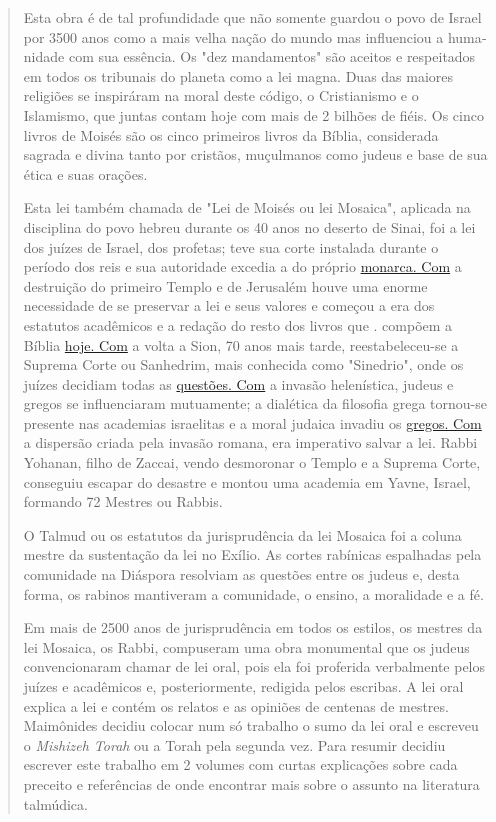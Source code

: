 \begin{quote}
Esta obra é de tal profundidade que não somente guardou o povo de Israel
por 3500 anos como a mais velha nação do mundo mas influenciou a
huma­nidade com sua essência. Os "dez mandamentos" são aceitos e
respeitados em to­dos os tribunais do planeta como a lei magna. Duas das
maiores religiões se inspirá­ram na moral deste código, o Cristianismo e
o Islamismo, que juntas contam hoje com mais de 2 bilhões de fiéis. Os
cinco livros de Moisés são os cinco primeiros livros da Bíblia,
considerada sagrada e divina tanto por cristãos, muçulmanos como judeus
e base de sua ética e suas orações.

Esta lei também chamada de "Lei de Moisés ou lei Mosaica", aplicada na
disciplina do povo hebreu durante os 40 anos no deserto de Sinai, foi a
lei dos juízes de Israel, dos profetas; teve sua corte instalada durante
o período dos reis
e sua autoridade excedia a do próprio
\href{http://monarca.Com}{{monarca. Com}} a destruição do primeiro
Tem­plo e de Jerusalém houve uma enorme necessidade de se preservar a
lei e seus valo­res e começou a era dos estatutos acadêmicos e a redação
do resto dos livros que . compõem a Bíblia \href{http://hoje.Com}{{hoje.
Com}} a volta a Sion, 70 anos mais tarde, reestabeleceu-se a Suprema
Corte ou Sanhedrim, mais conhecida como "Sinedrio", onde os juízes
decidiam todas as \href{http://questões.Com}{{questões. Com}} a invasão
helenística, judeus e gregos se influen­ciaram mutuamente; a dialética
da filosofia grega tornou-se presente nas academias israelitas e a moral
judaica invadiu os \href{http://gregos.Com}{{gregos. Com}} a dispersão
criada pela invasão romana, era imperativo salvar a lei. Rabbi Yohanan,
filho de Zaccai, vendo desmo­ronar o Templo e a Suprema Corte, conseguiu
escapar do desastre e montou uma academia em Yavne, Israel, formando 72
Mestres ou Rabbis.

O Talmud ou os estatutos da jurisprudência da lei Mosaica foi a coluna
mestre da sustentação da lei no Exílio. As cortes rabínicas espalhadas
pela comuni­dade na Diáspora resolviam as questões entre os judeus e,
desta forma, os rabinos mantiveram a comunidade, o ensino, a moralidade
e a fé.

Em mais de 2500 anos de jurisprudência em todos os estilos, os mestres
da lei Mosaica, os Rabbi, compuseram uma obra monumental que os judeus
con­vencionaram chamar de lei oral, pois ela foi proferida verbalmente
pelos juízes e acadêmicos e, posteriormente, redigida pelos escribas. A
lei oral explica a lei e con­tém os relatos e as opiniões de centenas de
mestres. Maimônides decidiu colocar num só trabalho o sumo da lei oral e
escreveu o \emph{Mishizeh Torah} ou a Torah pela segunda vez. Para
resumir decidiu escrever este trabalho em 2 volumes com curtas
explicações sobre cada preceito e referências de onde encontrar mais
sobre o as­sunto na literatura talmúdica.


\end{quote}
